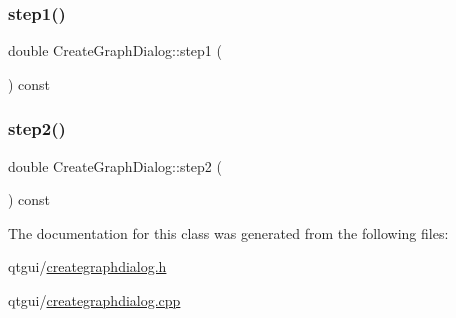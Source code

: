 \mbox{\label{class_create_graph_dialog_a065a3a4832854cd670f364d5869c152a}} 
\subsubsection{\texorpdfstring{step1()}{step1()}}
{\footnotesize\ttfamily double Create\+Graph\+Dialog\+::step1 (\begin{DoxyParamCaption}{ }\end{DoxyParamCaption}) const}

\mbox{\label{class_create_graph_dialog_a8d71c8f8da9f7eeda61cef830a664000}} 
\subsubsection{\texorpdfstring{step2()}{step2()}}
{\footnotesize\ttfamily double Create\+Graph\+Dialog\+::step2 (\begin{DoxyParamCaption}{ }\end{DoxyParamCaption}) const}



The documentation for this class was generated from the following files\+:\begin{DoxyCompactItemize}
\item 
qtgui/\mbox{\hyperlink{creategraphdialog_8h}{creategraphdialog.\+h}}\item 
qtgui/\mbox{\hyperlink{creategraphdialog_8cpp}{creategraphdialog.\+cpp}}\end{DoxyCompactItemize}
